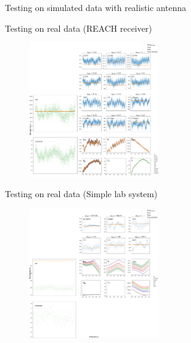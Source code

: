 \documentclass[aspectratio=169]{beamer}
\begin{document}
\begin{frame}{Testing on simulated data with realistic antenna}
	\begin{figure}
		\centering
		
	\end{figure}
\end{frame}

\begin{frame}{Testing on real data (REACH receiver)}
	\begin{figure}
		\centering
		\includegraphics[width=0.5\textwidth]{nima_best.png}
	\end{figure}
\end{frame}

\begin{frame}{Testing on real data (Simple lab system)}
	\begin{figure}
		\centering
		\includegraphics[width=0.5\textwidth]{kaan_best.png}
	\end{figure}
\end{frame}
\end{document}
